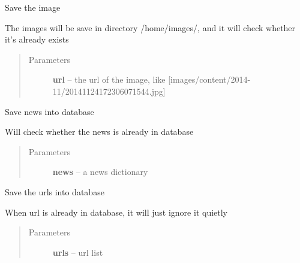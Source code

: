 \documentclass[letterpaper,10pt,english]{sphinxmanual}
\begin{document}

\begin{fulllineitems}
\label{sysunews:sysunews.db_module.save_img}
Save the image

The images will be save in directory /home/images/, and it will check whether it's already exists
\begin{quote}\begin{description}
\item[{Parameters}] \leavevmode
\textbf{url} -- the url of the image, like {[}images/content/2014-11/20141124172306071544.jpg{]}

\end{description}\end{quote}

\end{fulllineitems}


\begin{fulllineitems}
\label{sysunews:sysunews.db_module.save_news}
Save news into database

Will check whether the news is already in database
\begin{quote}\begin{description}
\item[{Parameters}] \leavevmode
\textbf{news} -- a news dictionary

\end{description}\end{quote}

\end{fulllineitems}


\begin{fulllineitems}
\label{sysunews:sysunews.db_module.save_urls}
Save the urls into database

When url is already in database, it will just ignore it quietly
\begin{quote}\begin{description}
\item[{Parameters}] \leavevmode
\textbf{urls} -- url list

\end{description}\end{quote}

\end{fulllineitems}
\end{document}
